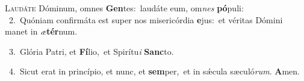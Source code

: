 \lettrine{\initial\textcolor{\initialcolor}{L}}{audáte} Dóminum, omnes \textbf{Gen}\-tes:~\star laudáte eum, om\textit{nes} \textbf{pó}\-puli:\\
{\numbfont\textcolor{\numbcolor}{~2.}}~Quóniam confirmáta est super nos misericórdia \textbf{e}\-jus:~\star et véritas Dómini manet in \textit{æ}\-\textbf{tér}num.\par
{\numbfont\textcolor{\numbcolor}{~3.}}~Glória Patri, et \textbf{Fí}\-lio,~\star et Spirítu\textit{i} \textbf{Sanc}\-to.\par
{\numbfont\textcolor{\numbcolor}{~4.}}~Sicut erat in princípio, et nunc, et \textbf{sem}\-per,~\star et in sǽcula sæculó\-\textit{rum}\-. \textbf{A}\-men.\par
